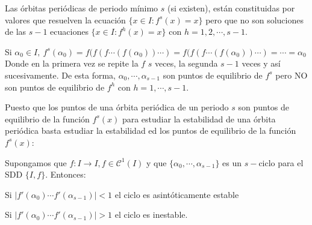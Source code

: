 \begin{nota}
	Las órbitas periódicas de periodo mínimo $s$ (si existen), están constituidas por valores que resuelven la ecuación $\{x \in I : f^s(x) = x\}$ pero que no son soluciones de las $s-1$ ecuaciones $\{x \in I : f^h(x) = x\}$ con $h=1,2,\cdots, s-1$.


	Si $\alpha_0 \in I, \ f^s(\alpha_0)= f(f(f\cdots(f(\alpha_0))\cdots)= f(f(f\cdots(f(\alpha_0))\cdots) =  \cdots = \alpha_0$
	Donde en la primera vez se repite la $f$ $s$ veces, la segunda $s-1$ veces y así sucesivamente. De esta forma, $\alpha_0,\cdots,\alpha_{s-1}$ son puntos  de equilibrio de $f^s$ pero NO son puntos de equilibrio de $f^h$ con $h = 1,\cdots, s-1$.
\end{nota}


Puesto que los puntos de una órbita periódica de un periodo $s$ son puntos de equilibrio de la función $f^s(x)$ para estudiar la estabilidad de una órbita periódica basta estudiar la estabilidad ed los puntos de equilibrio de la función $f^s(x)$:
\begin{nprop}
	Supongamos que $f:I \to I, f \in \mathcal{C}^1(I)$ y que $\{\alpha_0,\cdots, \alpha_{s-1}\}$ es un $s-$ciclo para el SDD $\{I,f\}$. Entonces:
	\begin{nlist}
	\item Si $|f'(\alpha_0)\cdots f'(\alpha_{s-1})|<1$ el ciclo es asintóticamente estable
	\item Si $|f'(\alpha_0)\cdots f'(\alpha_{s-1})|>1$ el ciclo es inestable.
\end{nlist}
\end{nprop}

